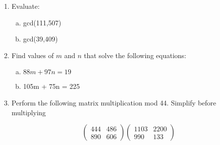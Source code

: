 \begin{enumerate}[(1)]
\item
Evaluate: 
\begin{enumerate}[(a)]
\item
 gcd(111,507) 
\item
gcd(39,409)
\end{enumerate}

\item
Find values of $m$ and $n$ that solve the following equations:
\begin{enumerate}[(a)]
\item
$88m + 97n = 19$
\item
105m + 75n = 225
\end{enumerate}

\item
Perform the following matrix multiplication mod 44. Simplify before multiplying

$$\left(
\begin{array}{cc}
444 & 486 \\
890 & 606
\end{array}
\right)
\left(
\begin{array}{cc}
1103 & 2200 \\
990 & 133
\end{array}
\right)$$


\end{enumerate}